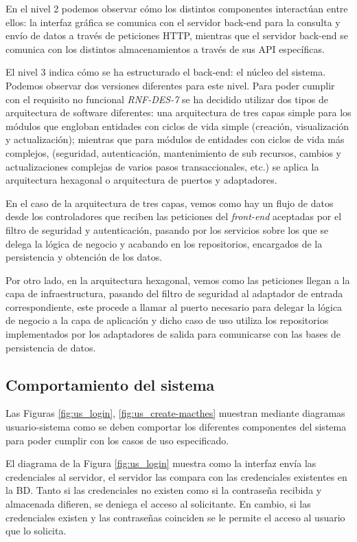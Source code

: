 En el nivel 2 podemos observar cómo los distintos componentes interactúan entre ellos: la interfaz gráfica se comunica con el servidor back-end para la consulta y envío de datos a través de peticiones HTTP, mientras que el servidor back-end se comunica con los distintos almacenamientos a través de sus API específicas. 

El nivel 3 indica cómo se ha estructurado el back-end: el núcleo del sistema. Podemos observar dos versiones diferentes para este nivel. Para poder cumplir con el requisito no funcional \emph{RNF-DES-7} se ha decidido utilizar dos tipos de arquitectura de software diferentes: una arquitectura de tres capas simple para los módulos que engloban entidades con ciclos de vida simple (creación, visualización y actualización); mientras que para módulos de entidades con ciclos de vida más complejos, (seguridad, autenticación, mantenimiento de sub recursos, cambios y actualizaciones complejas de varios pasos transaccionales, etc.) se aplica la arquitectura hexagonal o arquitectura de puertos y adaptadores.

En el caso de la arquitectura de tres capas, vemos como hay un flujo de datos desde los controladores que reciben las peticiones del \emph{front-end} aceptadas por el filtro de seguridad y autenticación, pasando por los servicios sobre los que se delega la lógica de negocio y acabando en los repositorios, encargados de la persistencia y obtención de los datos.

Por otro lado, en la arquitectura hexagonal, vemos como las peticiones llegan a la capa de infraestructura, pasando del filtro de seguridad al adaptador de entrada correspondiente, este procede a llamar al puerto necesario para delegar la lógica de negocio a la capa de aplicación y dicho caso de uso utiliza los repositorios implementados por los adaptadores de salida para comunicarse con las bases de persistencia de datos. 

\subsection{Comportamiento del sistema}

Las Figuras \ref{fig:us_login}, \ref{fig:us_create-macthes} muestran mediante diagramas usuario-sistema como se deben comportar los diferentes componentes del sistema para poder cumplir con los casos de uso especificado.

El diagrama de la Figura \ref{fig:us_login} muestra como la interfaz envía las credenciales al servidor, el servidor las compara con las credenciales existentes en la \ac{BD}. Tanto si las credenciales no existen como si la contraseña recibida y almacenada difieren, se deniega el acceso al solicitante. En cambio, si las credenciales existen y las contraseñas coinciden se le permite el acceso al usuario que lo solicita.

